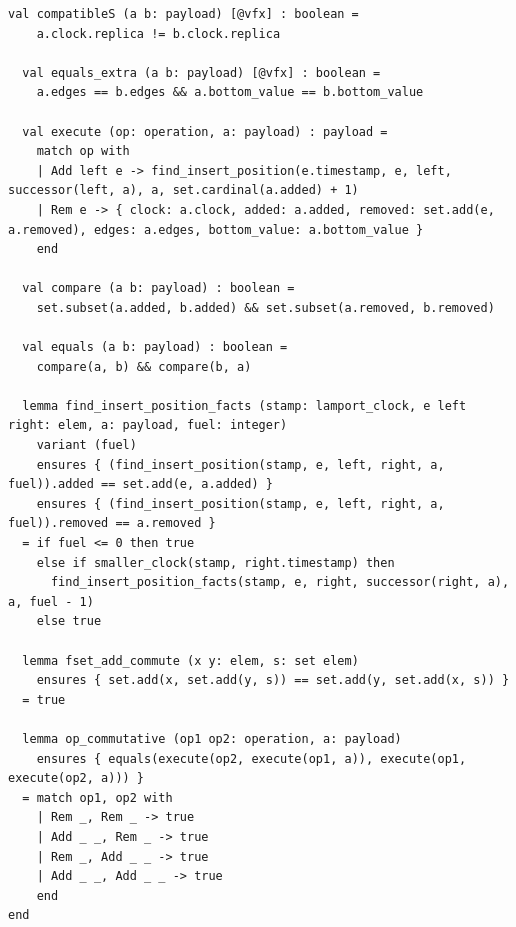 \begin{lstlisting}[caption={\texttt{RGA}}, label={lst:app_rga}]
  val compatibleS (a b: payload) [@vfx] : boolean =
    a.clock.replica != b.clock.replica

  val equals_extra (a b: payload) [@vfx] : boolean =
    a.edges == b.edges && a.bottom_value == b.bottom_value

  val execute (op: operation, a: payload) : payload =
    match op with
    | Add left e -> find_insert_position(e.timestamp, e, left, successor(left, a), a, set.cardinal(a.added) + 1)
    | Rem e -> { clock: a.clock, added: a.added, removed: set.add(e, a.removed), edges: a.edges, bottom_value: a.bottom_value }
    end

  val compare (a b: payload) : boolean =
    set.subset(a.added, b.added) && set.subset(a.removed, b.removed)

  val equals (a b: payload) : boolean =
    compare(a, b) && compare(b, a)

  lemma find_insert_position_facts (stamp: lamport_clock, e left right: elem, a: payload, fuel: integer)
    variant (fuel)
    ensures { (find_insert_position(stamp, e, left, right, a, fuel)).added == set.add(e, a.added) }
    ensures { (find_insert_position(stamp, e, left, right, a, fuel)).removed == a.removed }
  = if fuel <= 0 then true
    else if smaller_clock(stamp, right.timestamp) then
      find_insert_position_facts(stamp, e, right, successor(right, a), a, fuel - 1)
    else true

  lemma fset_add_commute (x y: elem, s: set elem)
    ensures { set.add(x, set.add(y, s)) == set.add(y, set.add(x, s)) }
  = true

  lemma op_commutative (op1 op2: operation, a: payload)
    ensures { equals(execute(op2, execute(op1, a)), execute(op1, execute(op2, a))) }
  = match op1, op2 with
    | Rem _, Rem _ -> true
    | Add _ _, Rem _ -> true
    | Rem _, Add _ _ -> true
    | Add _ _, Add _ _ -> true
    end
end
\end{lstlisting}
